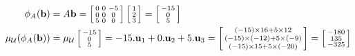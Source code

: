\begin{itemize}
\begin{align*}
    \phi_A(\vb) &= A\vb = \bsm 0&0&-5\\ 0&0&0\\ 5&0&0\esm
                          \bsm 1\\ 2\\ 3\esm
                 = \bsm -15\\ 0\\ 5 \esm \\
    \mu_\CU(\phi_A(\vb)) &=
     \mu_\CU\bsm -15\\ 0\\ 5\esm =
      -15.\vu_1 + 0.\vu_2 + 5.\vu_3 =
      \bsm (-15)\tm 16 + 5\tm 12 \\
           (-15)\tm(-12) + 5\tm(-9) \\
           (-15)\tm 15 + 5\tm(-20) \esm =
      \bsm -180 \\ 135 \\ -325 \esm
   \end{align*}
 \end{itemize}
\EndDeferredSolution

